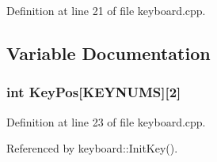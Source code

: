 Definition at line 21 of file keyboard.cpp.

\subsection{Variable Documentation}
\subsubsection{\setlength{\rightskip}{0pt plus 5cm}int {\bf Key\-Pos}[KEYNUMS][2]}\label{keyboard_8cpp_a1}




Definition at line 23 of file keyboard.cpp.

Referenced by keyboard::Init\-Key().